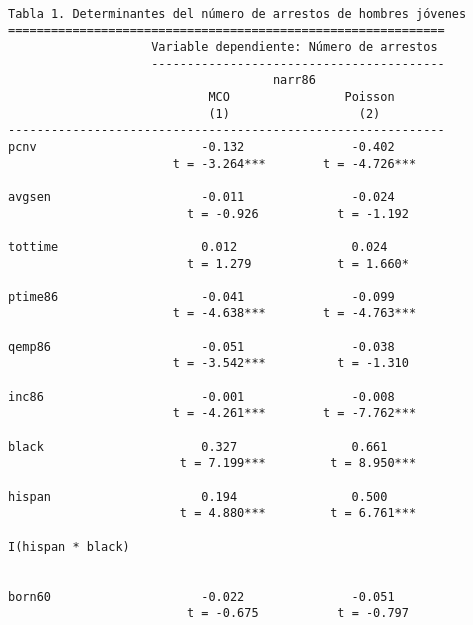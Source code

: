 \documentclass[
  letterpaper,
  DIV=11,
  numbers=noendperiod]{scrreprt}
\begin{document}
\begin{verbatim}

Tabla 1. Determinantes del número de arrestos de hombres jóvenes
=============================================================
                    Variable dependiente: Número de arrestos 
                    -----------------------------------------
                                     narr86                  
                            MCO                Poisson       
                            (1)                  (2)         
-------------------------------------------------------------
pcnv                       -0.132               -0.402       
                       t = -3.264***        t = -4.726***    
                                                             
avgsen                     -0.011               -0.024       
                         t = -0.926           t = -1.192     
                                                             
tottime                    0.012                0.024        
                         t = 1.279            t = 1.660*     
                                                             
ptime86                    -0.041               -0.099       
                       t = -4.638***        t = -4.763***    
                                                             
qemp86                     -0.051               -0.038       
                       t = -3.542***          t = -1.310     
                                                             
inc86                      -0.001               -0.008       
                       t = -4.261***        t = -7.762***    
                                                             
black                      0.327                0.661        
                        t = 7.199***         t = 8.950***    
                                                             
hispan                     0.194                0.500        
                        t = 4.880***         t = 6.761***    
                                                             
I(hispan * black)                                            
                                                             
                                                             
born60                     -0.022               -0.051       
                         t = -0.675           t = -0.797     
                                                             

\end{verbatim}
\end{document}
